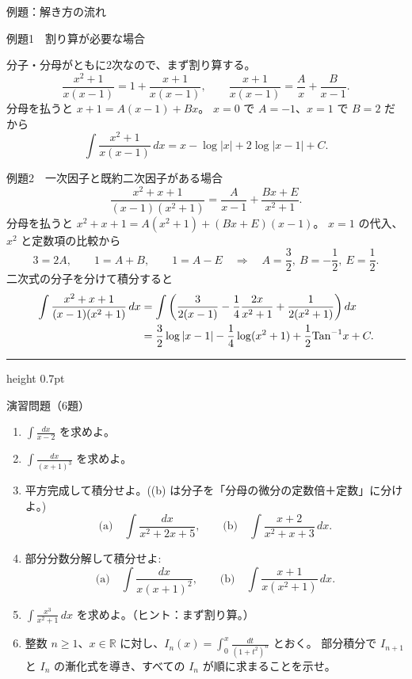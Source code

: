 \documentclass[a4paper,10pt,pdflatex,ja=standard,jafont=ipaex-type1,
  magstyle=real,scale=1]{bxjsarticle}
\newcommand{\topic}[1]{\par\vspace{5pt}%
  {\large\sffamily\mdseries\color{accent}#1}\par\vspace{2pt}}
\newenvironment{problems}
  {\begin{enumerate}[leftmargin=2em,itemsep=3pt,topsep=3pt,parsep=0pt,
    font=\color{accent}]}
  {\end{enumerate}}
\newcommand{\examplelabel}[1]{{\sffamily\mdseries\color{ink}#1}}
\newcommand{\problemspace}{\par\vspace{3mm}}
\newcommand{\exercises}{%
  {\color{accent}\hrule height 0.7pt}\vspace{3pt}%
  \topic{演習問題（6題）}%
}
\begin{document}
\newpage
\noindent\begin{minipage}[b][\dimexpr0.5\textheight-\parskip\relax][t]{\linewidth}
\topic{例題：解き方の流れ}
\examplelabel{例題1　割り算が必要な場合}\par
分子・分母がともに2次なので、まず割り算する。
$$
 \frac{x^2+1}{x(x-1)}=1+\frac{x+1}{x(x-1)},\qquad
 \frac{x+1}{x(x-1)}=\frac Ax+\frac B{x-1}.
$$
分母を払うと $x+1=A(x-1)+Bx$。
$x=0$ で $A=-1$、$x=1$ で $B=2$ だから
$$
 \int\frac{x^2+1}{x(x-1)}\,dx=x-\log|x|+2\log|x-1|+C.
$$

\medskip
\examplelabel{例題2　一次因子と既約二次因子がある場合}
$$
 \frac{x^2+x+1}{(x-1)(x^2+1)}=\frac A{x-1}+\frac{Bx+E}{x^2+1}.
$$
分母を払うと $x^2+x+1=A(x^2+1)+(Bx+E)(x-1)$。
$x=1$ の代入、$x^2$ と定数項の比較から
$$
 3=2A,\qquad 1=A+B,\qquad 1=A-E
 \quad\Longrightarrow\quad A=\frac32,\ B=-\frac12,\ E=\frac12.
$$
二次式の分子を分けて積分すると
$$
 \begin{aligned}
 \int\frac{x^2+x+1}{(x-1)(x^2+1)}\,dx
 &=\int\left(\frac{3}{2(x-1)}-\frac14\frac{2x}{x^2+1}
      +\frac1{2(x^2+1)}\right)dx\\
 &=\frac32\log|x-1|-\frac14\log(x^2+1)+\frac12{\rm Tan}^{-1}  x+C.
 \end{aligned}
$$
\end{minipage}\par\nointerlineskip
\noindent\begin{minipage}[b][0.5\textheight][t]{\linewidth}
\exercises
\begin{problems}
\item $\displaystyle\int\frac{dx}{x-2}$ を求めよ。
\problemspace

\item $\displaystyle\int\frac{dx}{(x+1)^3}$ を求めよ。
\problemspace

\item 平方完成して積分せよ。((b) は分子を「分母の微分の定数倍＋定数」に分けよ。)
$$
 \text{(a)}\quad\int\frac{dx}{x^2+2x+5},\qquad
 \text{(b)}\quad\int\frac{x+2}{x^2+x+3}\,dx.
$$
\problemspace

\item 部分分数分解して積分せよ:
$$
 \text{(a)}\quad\int\frac{dx}{x(x+1)^2},\qquad
 \text{(b)}\quad\int\frac{x+1}{x(x^2+1)}\,dx.
$$
\problemspace

\item $\displaystyle\int\frac{x^3}{x^2+1}\,dx$ を求めよ。（ヒント：まず割り算。）
\problemspace

\item 整数 $n\ge1$、$x\in\mathbb R$ に対し、$I_n(x)=\displaystyle\int_0^x\frac{dt}{(1+t^2)^n}$ とおく。
部分積分で $I_{n+1}$ と $I_n$ の漸化式を導き、すべての $I_n$ が順に求まることを示せ。
\problemspace
\end{problems}
\end{minipage}
\end{document}
